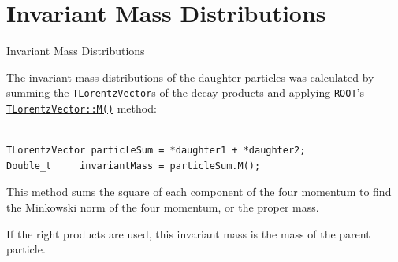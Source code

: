 \section{Invariant Mass Distributions}

\begin{frame}[fragile]{Invariant Mass Distributions}
\begin{itemize}

    \Item The invariant mass distributions of the daughter particles was calculated
        by summing the \texttt{TLorentzVector}s of the decay products and applying
        \texttt{ROOT}'s
        \href{http://root.cern.ch/root/html/TLorentzVector.html\#TLorentzVector:M}{\texttt{TLorentzVector::M()}}
        method:
    
    \begin{verbatim}

TLorentzVector particleSum = *daughter1 + *daughter2;
Double_t     invariantMass = particleSum.M();

    \end{verbatim}
    
    \Item This method sums the square of each component of the four momentum to
        find the Minkowski norm of the four momentum, or the proper mass.
    
    \Item If the right products are used, this invariant mass is the mass of the
        parent particle.

\end{itemize}
\end{frame}

